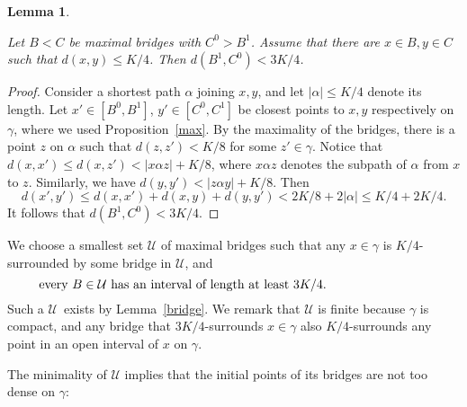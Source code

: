 \documentclass[a4paper]{article}
\newtheorem{lemma}[proposition]{Lemma}
\newcommand{\cu}{\ensuremath{\mathcal U}}
\newcommand{\Lr}[1]{Lemma~\ref{#1}}
\newcommand{\Prr}[1]{Pro\-position~\ref{#1}}
\newcommand{\labtequ}[2]{\begin{equation} \label{#1} 	\begin{minipage}[c]{0.9\textwidth}  #2 \end{minipage} \ignorespacesafterend \end{equation} }
\begin{document}
\begin{lemma} \label{disjoint}

Let $B<C$ be maximal bridges with $C^0> B^1$.
Assume that there are $x\in B, y\in C$ such that $d(x,y)\leq K/4$. Then  $d(B^1,C^0)< 3K/4$.  
\end{lemma}
\begin{proof} Consider a shortest path $\alpha $ joining $x,y$, and let $|\alpha|\leq K/4$ denote its length. Let $x'\in[B^0,B^1]$, $y'\in [C^0,C^1]$ be closest points to $x,y$ respectively
on $\gamma$, where we used \Prr{max}. By the maximality of the bridges, there is a point $z$ on $\alpha $ such that $d(z,z')<K/8$ for some $z'\in \gamma $. Notice that $d(x,x') \leq d(x,z') < |x \alpha z| + K/8$, where $x \alpha z$ denotes the subpath of $\alpha$ from $x$ to $z$. Similarly, we have $d(y,y') < |z \alpha y| + K/8$.
Then $$d(x',y')\leq d(x,x')+d(x,y)+d(y,y')< 2K/8 + 2 |\alpha| \leq K/4 + 2K/4.$$
It follows that $d(B^1,C^0) < 3K/4$.
\end{proof}

We choose a smallest set $\mathcal U$ of maximal bridges such that any $x\in \gamma $ is $K/4$-surrounded by some 
bridge in $\mathcal U$, and 
\labtequ{length}{every $B\in \cu$ has an interval of length at least $3K/4$.} Such a \cu\ exists by \Lr{bridge}. We remark that $\mathcal U$ is finite because $\gamma$ is compact, and any bridge that $3K/4$-surrounds $x\in \gamma $ also $K/4$-surrounds any point in an open interval of $x$ on $\gamma$. 


The minimality of $\mathcal U$ implies that the initial points of its bridges are not too dense on $\gamma$:
\end{document}
